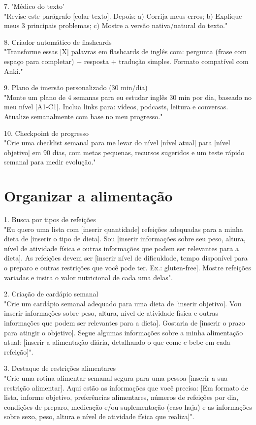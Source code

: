 \documentclass[11pt, a4paper]{article}
\begin{document}
7. 'Médico do texto' \\
"Revise este parágrafo [colar texto]. Depois: a) Corrija meus erros; b) Explique meus 3 principais problemas; c) Mostre a versão nativa/natural do texto." 

8. Criador automático de flashcards \\
"Transforme essas [X] palavras em flashcards de inglês com: pergunta (frase com espaço para completar) + resposta + tradução simples. Formato compatível com Anki." 

9. Plano de imersão personalizado (30 min/dia) \\
"Monte um plano de 4 semanas para eu estudar inglês 30 min por dia, baseado no meu nível [A1-C1]. Inclua links para: vídeos, podcasts, leitura e conversas. Atualize semanalmente com base no meu progresso." 

10. Checkpoint de progresso \\
"Crie uma checklist semanal para me levar do nível [nível atual] para [nível objetivo] em 90 dias, com metas pequenas, recursos sugeridos e um teste rápido semanal para medir evolução." 

\section*{Organizar a alimentação}
1. Busca por tipos de refeições \\
"Eu quero uma lista com [inserir quantidade] refeições adequadas para a minha dieta de [inserir o tipo de dieta]. Sou [inserir informações sobre seu peso, altura, nível de atividade física e outras informações que podem ser relevantes para a dieta]. As refeições devem ser [inserir nível de dificuldade, tempo disponível para o preparo e outras restrições que você pode ter. Ex.: gluten-free]. Mostre refeições variadas e insira o valor nutricional de cada uma delas". 

2. Criação de cardápio semanal \\
"Crie um cardápio semanal adequado para uma dieta de [inserir objetivo]. Vou inserir informações sobre peso, altura, nível de atividade física e outras informações que podem ser relevantes para a dieta]. Gostaria de [inserir o prazo para atingir o objetivo]. Segue algumas informações sobre a minha alimentação atual: [inserir a alimentação diária, detalhando o que come e bebe em cada refeição]".

3. Destaque de restrições alimentares \\
"Crie uma rotina alimentar semanal segura para uma pessoa [inserir a sua restrição alimentar]. Aqui estão as informações que você precisa: [Em formato de lista, informe objetivo, preferências alimentares, números de refeições por dia, condições de preparo, medicação e/ou suplementação (caso haja) e as informações sobre sexo, peso, altura e nível de atividade física que realiza]".
\end{document}
